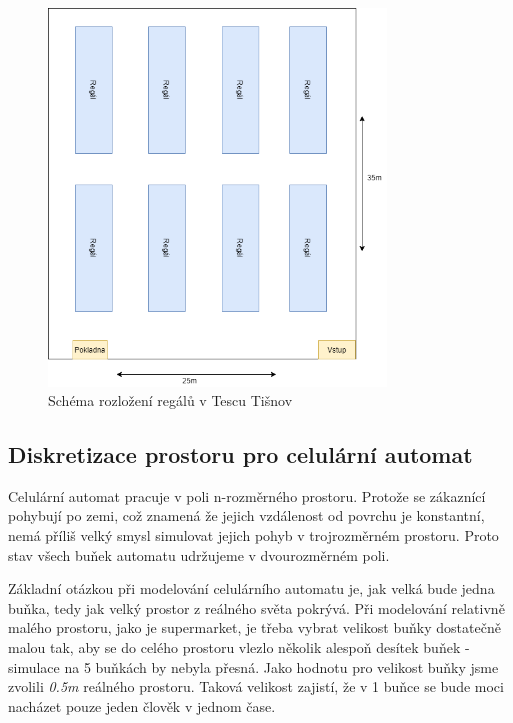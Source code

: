 \documentclass[11pt,a4paper]{article}
\begin{document}
\begin{figure}[h!]
  \caption{Schéma rozložení regálů v Tescu Tišnov}
  \label{figtes}
  \begin{center}
    \includegraphics[width=0.8\textwidth]{tescoscheme.png}
    \end{center}
\end{figure}    

\subsection{Diskretizace prostoru pro celulární automat}
Celulární automat pracuje v poli n-rozměrného prostoru. Protože se zákaznící pohybují po zemi, což znamená že jejich vzdálenost od povrchu je konstantní, nemá příliš velký smysl simulovat jejich pohyb v trojrozměrném prostoru. Proto stav všech buňek automatu udržujeme v dvourozměrném poli.

Základní otázkou při modelování celulárního automatu je, jak velká bude jedna buňka, tedy jak velký prostor z reálného světa pokrývá. Při modelování relativně malého prostoru, jako je supermarket, je třeba vybrat velikost buňky dostatečně malou tak, aby se do celého prostoru vlezlo několik alespoň desítek buňek - simulace na 5 buňkách by nebyla přesná.
Jako hodnotu pro velikost buňky jsme zvolili \emph{0.5m} reálného prostoru. Taková velikost zajistí, že v 1 buňce se bude moci nacházet pouze jeden člověk v jednom čase.
\end{document}
